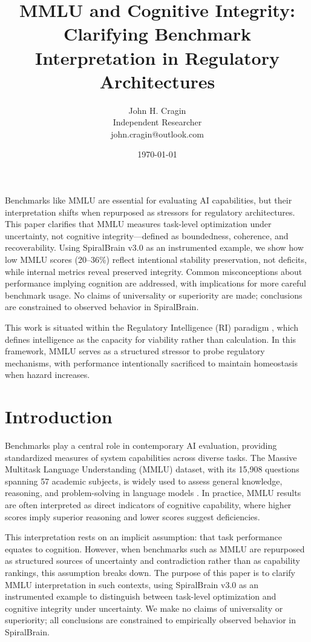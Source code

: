 \documentclass[12pt,a4paper]{report}
\title{MMLU and Cognitive Integrity: Clarifying Benchmark Interpretation in Regulatory Architectures}
\author{John H. Cragin \\
Independent Researcher \\
john.cragin@outlook.com}
\date{\today}
\begin{document}
\maketitle

Benchmarks like MMLU are essential for evaluating AI capabilities, but their interpretation shifts when repurposed as stressors for regulatory architectures. This paper clarifies that MMLU measures task-level optimization under uncertainty, not cognitive integrity—defined as boundedness, coherence, and recoverability. Using SpiralBrain v3.0 as an instrumented example, we show how low MMLU scores (20–36\%) reflect intentional stability preservation, not deficits, while internal metrics reveal preserved integrity. Common misconceptions about performance implying cognition are addressed, with implications for more careful benchmark usage. No claims of universality or superiority are made; conclusions are constrained to observed behavior in SpiralBrain.

This work is situated within the Regulatory Intelligence (RI) paradigm \cite{Cragin2026Thesis}, which defines intelligence as the capacity for viability rather than calculation. In this framework, MMLU serves as a structured stressor to probe regulatory mechanisms, with performance intentionally sacrificed to maintain homeostasis when hazard increases.

\section{Introduction}

Benchmarks play a central role in contemporary AI evaluation, providing standardized measures of system capabilities across diverse tasks. The Massive Multitask Language Understanding (MMLU) dataset, with its 15,908 questions spanning 57 academic subjects, is widely used to assess general knowledge, reasoning, and problem-solving in language models \cite{hendrycks2020measuring}. In practice, MMLU results are often interpreted as direct indicators of cognitive capability, where higher scores imply superior reasoning and lower scores suggest deficiencies.

This interpretation rests on an implicit assumption: that task performance equates to cognition. However, when benchmarks such as MMLU are repurposed as structured sources of uncertainty and contradiction rather than as capability rankings, this assumption breaks down. The purpose of this paper is to clarify MMLU interpretation in such contexts, using SpiralBrain v3.0 as an instrumented example to distinguish between task-level optimization and cognitive integrity under uncertainty. We make no claims of universality or superiority; all conclusions are constrained to empirically observed behavior in SpiralBrain.
\end{document}
